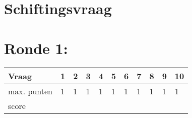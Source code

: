 \begin{center}
\end{center}
\vspace{5mm}
 
 
\vspace{5mm}
 
\section{Schiftingsvraag}
\enspace\hrulefill

\section{Ronde 1:}
\begin{questions}

\question[1] \enspace\hrulefill
\question[1] \enspace\hrulefill
\question[1] \enspace\hrulefill
\question[1] \enspace\hrulefill
\question[1] \enspace\hrulefill
\question[1] \enspace\hrulefill
\question[1] \enspace\hrulefill
\question[1] \enspace\hrulefill
\question[1] \enspace\hrulefill
\question[1] \enspace\hrulefill

\end{questions}
\begin{table}[!b]
\centering
\begin{tabular}{|l|l|l|l|l|l|l|l|l|l|l|}
\hline
Vraag       & 1 & 2 & 3 & 4 & 5 & 6 & 7 & 8 & 9 & 10 \\ \hline
max. punten & 1 & 1 & 1 & 1 & 1 & 1 & 1 & 1 & 1 & 1  \\ \hline
score       &   &   &   &   &   &   &   &   &   &    \\ \hline
\end{tabular}
\end{table}
\newpage
